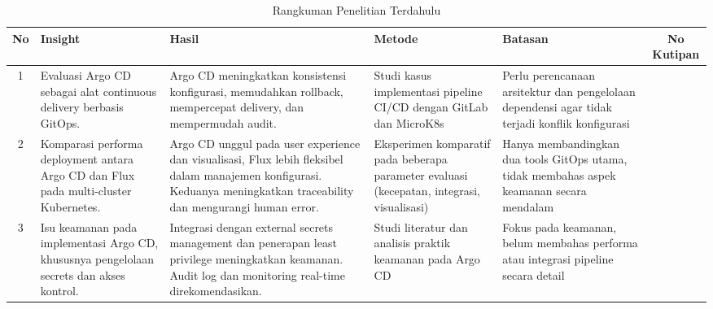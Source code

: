 \begin{table}[H]
  \centering
  \begin{adjustbox}{width=\textwidth}
    \begin{tabular}{|c|p{4cm}|p{3cm}|p{2.5cm}|p{3cm}|c|}
      \hline
      \textbf{No} & \textbf{Insight}                                                                         & \textbf{Hasil}                                                                                                                                                        & \textbf{Metode}                                                                            & \textbf{Batasan}                                                                               & \textbf{No Kutipan} \\
      \hline
      1           & Evaluasi Argo CD sebagai alat continuous delivery berbasis GitOps.                       & Argo CD meningkatkan konsistensi konfigurasi, memudahkan rollback, mempercepat delivery, dan mempermudah audit.                                                       & Studi kasus implementasi pipeline CI/CD dengan GitLab dan MicroK8s                         & Perlu perencanaan arsitektur dan pengelolaan dependensi agar tidak terjadi konflik konfigurasi & \cite{Korhonen2021} \\
      \hline
      2           & Komparasi performa deployment antara Argo CD dan Flux pada multi-cluster Kubernetes.     & Argo CD unggul pada user experience dan visualisasi, Flux lebih fleksibel dalam manajemen konfigurasi. Keduanya meningkatkan traceability dan mengurangi human error. & Eksperimen komparatif pada beberapa parameter evaluasi (kecepatan, integrasi, visualisasi) & Hanya membandingkan dua tools GitOps utama, tidak membahas aspek keamanan secara mendalam      & \cite{Sharma2022}   \\
      \hline
      3           & Isu keamanan pada implementasi Argo CD, khususnya pengelolaan secrets dan akses kontrol. & Integrasi dengan external secrets management dan penerapan least privilege meningkatkan keamanan. Audit log dan monitoring real-time direkomendasikan.                & Studi literatur dan analisis praktik keamanan pada Argo CD                                 & Fokus pada keamanan, belum membahas performa atau integrasi pipeline secara detail             & \cite{Kumar2023}    \\
      \hline
    \end{tabular}
  \end{adjustbox}
  \caption{Rangkuman Penelitian Terdahulu}
  \label{tab:tinjauan-pustaka}
\end{table}

